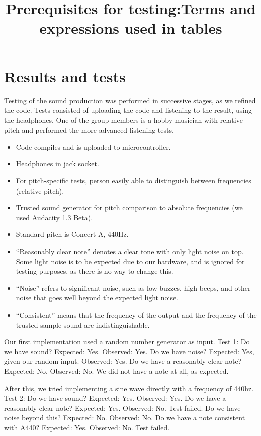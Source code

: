 \section{Results and tests}

Testing of the sound production was performed in successive stages, as we refined the code. Tests consisted of uploading the code and listening to the result, using the headphones. One of the group members is a hobby musician with relative pitch and performed the more advanced listening tests.

\title{Prerequisites for testing:}
\begin{itemize}
\item Code compiles and is uploaded to microcontroller.
\item Headphones in jack socket.
\item For pitch-specific tests, person easily able to distinguish between frequencies (relative pitch).
\item Trusted sound generator for pitch comparison to absolute frequencies (we used Audacity 1.3 Beta).
\item Standard pitch is Concert A, 440Hz.
\end{itemize}

\title{Terms and expressions used in tables}
\begin{itemize}
\item ``Reasonably clear note'' denotes a clear tone with only light noise on top. Some light noise is to be expected due to our hardware, and is ignored for testing purposes, as there is no way to change this.
\item ``Noise'' refers to significant noise, such as low buzzes, high beeps, and other noise that goes well beyond the expected light noise.
\item ``Consistent'' means that the frequency of the output and the frequency of the trusted sample sound are indistinguishable.
\end{itemize}

Our first implementation used a random number generator as input.
Test 1:
Do we have sound? Expected: Yes. Observed: Yes.
Do we have noise? Expected: Yes, given our random input. Observed: Yes.
Do we have a reasonably clear note? Expected: No. Observed: No. We did not have a note at all, as expected.

After this, we tried implementing a sine wave directly with a frequency of 440hz.
Test 2:
Do we have sound? Expected: Yes. Observed: Yes.
Do we have a reasonably clear note? Expected: Yes. Observed: No. Test failed.
Do we have noise beyond this? Expected: No. Observed: No.
Do we have a note consistent with A440? Expected: Yes. Observed: No. Test failed.

